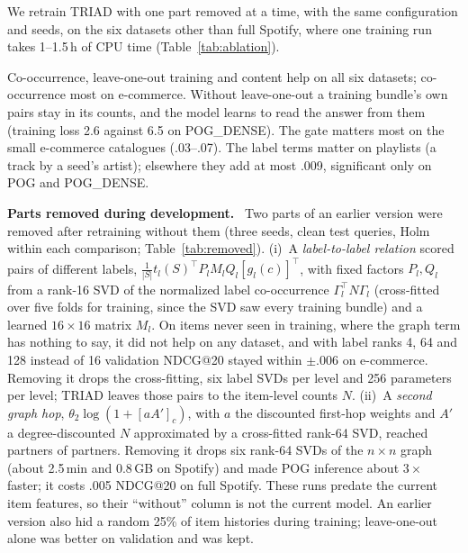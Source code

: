 \documentclass[runningheads]{llncs}
\renewcommand{\paragraph}[1]{\smallskip\noindent\textbf{#1}\ }
\begin{document}
We retrain TRIAD with one part removed at a time, with the same configuration and seeds, on the six datasets other
than full Spotify, where one training run takes 1--1.5\,h of CPU time (Table~\ref{tab:ablation}).

Co-occurrence, leave-one-out training and content help on all six datasets; co-occurrence most on e-commerce. Without
leave-one-out a training bundle's own pairs stay in its counts, and the model learns to read the answer from them
(training loss 2.6 against 6.5 on POG\_DENSE). The gate matters most on the small e-commerce catalogues (.03--.07). The
label terms matter on playlists (a track by a seed's artist); elsewhere they add at most .009, significant only on POG
and POG\_DENSE.

\paragraph{Parts removed during development.} Two parts of an earlier version were removed after retraining without
them (three seeds, clean test queries, Holm within each comparison; Table~\ref{tab:removed}).
(i)~A \emph{label-to-label relation} scored pairs of different labels,
$\tfrac{1}{|S|}t_l(S)^{\top}P_lM_lQ_l[g_l(c)]^{\top}$, with fixed factors $P_l,Q_l$ from a rank-16 SVD of the
normalized label co-occurrence $\Gamma_l^{\top}N\Gamma_l$ (cross-fitted over five folds for training, since the SVD saw
every training bundle) and a learned $16\times16$ matrix $M_l$. On items never seen in training, where the graph term
has nothing to say, it did not help on any dataset, and with label ranks 4, 64 and 128 instead of 16 validation
NDCG@20 stayed within $\pm$.006 on e-commerce. Removing it drops the cross-fitting, six label SVDs per level and 256
parameters per level; TRIAD leaves those pairs to the item-level counts $N$.
(ii)~A \emph{second graph hop}, $\theta_2\log(1+[aA']_c)$, with $a$ the discounted first-hop weights and $A'$ a
degree-discounted $N$ approximated by a cross-fitted rank-64 SVD, reached partners of partners. Removing it drops six
rank-64 SVDs of the $n\times n$ graph (about 2.5\,min and 0.8\,GB on Spotify) and made POG inference about
$3\times$ faster; it costs .005 NDCG@20 on full Spotify. These runs predate the current item features, so their
``without'' column is not the current model. An earlier version also hid a random 25\% of item histories during
training; leave-one-out alone was better on validation and was kept.
\end{document}
